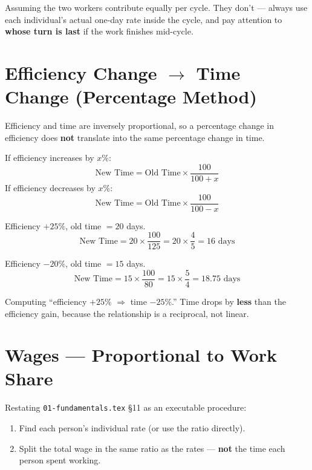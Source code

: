 \documentclass[11pt]{article}
\begin{document}
\begin{warnbox}
Assuming the two workers contribute equally per cycle. They don't --- always use each individual's
actual one-day rate inside the cycle, and pay attention to \textbf{whose turn is last} if the work
finishes mid-cycle.
\end{warnbox}

\section{Efficiency Change $\to$ Time Change (Percentage Method)}
Efficiency and time are inversely proportional, so a percentage change in efficiency does
\textbf{not} translate into the same percentage change in time.

\begin{formulabox}[Formulas]
If efficiency increases by $x\%$:
\[
\text{New Time} = \text{Old Time} \times \frac{100}{100+x}
\]
If efficiency decreases by $x\%$:
\[
\text{New Time} = \text{Old Time} \times \frac{100}{100-x}
\]
\end{formulabox}

\begin{examplebox}
Efficiency $+25\%$, old time $= 20$ days.
\[
\text{New Time} = 20 \times \frac{100}{125} = 20 \times \frac{4}{5} = 16 \text{ days}
\]
\end{examplebox}

\begin{examplebox}
Efficiency $-20\%$, old time $= 15$ days.
\[
\text{New Time} = 15 \times \frac{100}{80} = 15 \times \frac{5}{4} = 18.75 \text{ days}
\]
\end{examplebox}

\begin{warnbox}
Computing ``efficiency $+25\%$ $\Rightarrow$ time $-25\%$.'' Time drops by \textbf{less} than the
efficiency gain, because the relationship is a reciprocal, not linear.
\end{warnbox}

\section{Wages --- Proportional to Work Share}
Restating \texttt{01-fundamentals.tex} \S11 as an executable procedure:
\begin{formulabox}[Procedure]
\begin{enumerate}[leftmargin=1.4em]
  \item Find each person's individual rate (or use the ratio directly).
  \item Split the total wage in the same ratio as the rates --- \textbf{not} the time each person
    spent working.
\end{enumerate}
\end{formulabox}
\end{document}
